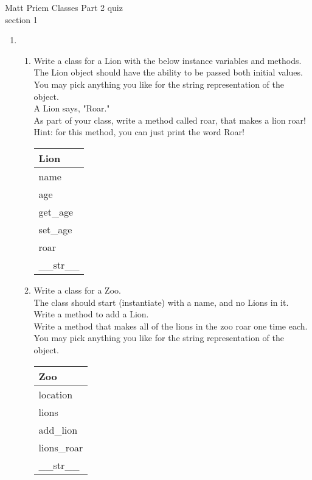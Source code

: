 \documentclass{article}
\begin{document}

Matt Priem \hfill Classes Part 2 quiz\\
section 1\\
\begin{enumerate}

	\item
	\begin{enumerate}
		\item
			Write a class for a Lion with the below instance variables and methods.\\ 
			The Lion object should have the ability to be passed both initial values.\\  
			You may pick anything you like for the string representation of the object.\\
			A Lion says, "Roar."\\  
			As part of your class, write a method called roar, that makes a lion roar!\\
			Hint: for this method, you can just print the word Roar!
			\begin{flushright}
			\begin{tabular}{|l|}
				\hline
				Lion\\ \hline
				name\\	age\\	 \hline
				get\_age \\ set\_age \\ roar \\ \_\_str\_\_ \\ \hline
			\end{tabular}
			\end{flushright}

		\item
			Write a class for a Zoo. \\
			The class should start (instantiate) with a name, and no Lions in it. \\ 
			Write a method to add a Lion.\\
			Write a method that makes all of the lions in the zoo roar one time each.\\
			You may pick anything you like for the string representation of the object.
	
			\begin{flushright}
			\begin{tabular}{|l|}
				\hline
				Zoo\\ \hline  	%
				location\\ lions\\ \hline		%
				add\_lion\\ lions\_roar \\ \_\_str\_\_ \\ \hline		%
			\end{tabular}
			\end{flushright}


\end{enumerate}
\end{enumerate}
\end{document}
